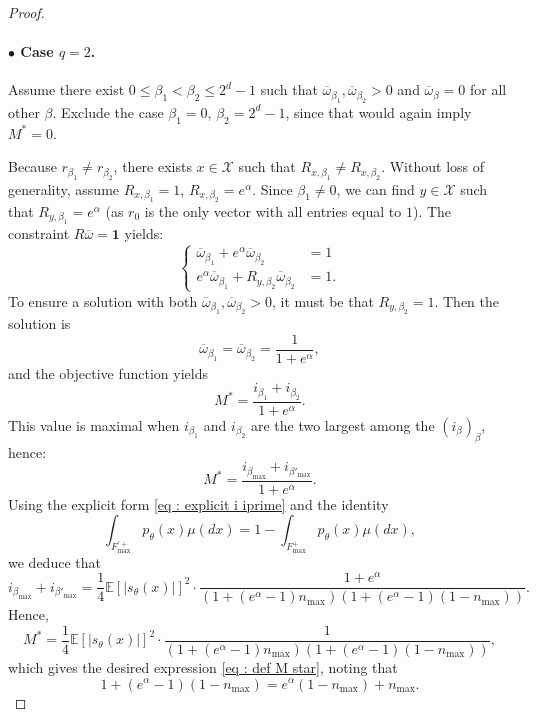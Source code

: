 \documentclass[a4paper, 11pt]{article}
\theoremstyle{definition}
\begin{document}
{\begin{proof}
\paragraph{$\bullet$ Case $q = 2$.}
Assume there exist $0 \le \beta_1 < \beta_2 \le 2^d - 1$ such that $\overline{\omega}_{\beta_1}, \overline{\omega}_{\beta_2} > 0$ and $\overline{\omega}_\beta = 0$ for all other $\beta$. Exclude the case $\beta_1 = 0$, $\beta_2 = 2^d - 1$, since that would again imply $M^* = 0$.

Because $r_{\beta_1} \ne r_{\beta_2}$, there exists $x \in \mathcal{X}$ such that $R_{x,\beta_1} \ne R_{x,\beta_2}$. Without loss of generality, assume $R_{x,\beta_1} = 1$, $R_{x,\beta_2} = e^\alpha$. Since $\beta_1 \ne 0$, we can find $y \in \mathcal{X}$ such that $R_{y,\beta_1} = e^\alpha$ (as $r_0$ is the only vector with all entries equal to $1$). The constraint $R \overline{\omega} = \bm{1}$ yields:
\begin{equation}\label{eq: system 14.5}
\left\{
\begin{aligned}
\overline{\omega}_{\beta_1} + e^\alpha \overline{\omega}_{\beta_2} &= 1 \\
e^\alpha \overline{\omega}_{\beta_1} + R_{y,\beta_2} \overline{\omega}_{\beta_2} &= 1.
\end{aligned}
\right.
\end{equation}
To ensure a solution with both $\overline{\omega}_{\beta_1}, \overline{\omega}_{\beta_2} > 0$, it must be that $R_{y,\beta_2} = 1$. Then the solution is
\[
\overline{\omega}_{\beta_1} = \overline{\omega}_{\beta_2} = \frac{1}{1 + e^\alpha},
\]
and the objective function yields
\[
M^* = \frac{i_{\beta_1} + i_{\beta_2}}{1 + e^\alpha}.
\]
This value is maximal when $i_{\beta_1}$ and $i_{\beta_2}$ are the two largest among the $(i_\beta)_\beta$, hence:
\begin{equation}\label{eq : maximume q is 2}
M^* = \frac{i_{\beta_{\max}} + i_{\beta'_{\max}}}{1 + e^\alpha}.
\end{equation}
Using the explicit form \eqref{eq : explicit i iprime} and the identity
\[
\int_{F^{\prime +}_{\max}} p_\theta(x)\mu(dx) = 1 - \int_{F^{+}_\text{max}} p_\theta(x)\mu(dx),
\]
we deduce that
\[
i_{\beta_{\max}} + i_{\beta'_{\max}} = \frac{1}{4} \mathbb{E}[|s_\theta(x)|]^2 \cdot \frac{1 + e^\alpha}{\left(1 + (e^\alpha - 1)n_{\max}\right)\left(1 + (e^\alpha - 1)(1 - n_{\max})\right)}.
\]
Hence,
\[
M^* = \frac{1}{4} \mathbb{E}[|s_\theta(x)|]^2 \cdot \frac{1}{\left(1 + (e^\alpha - 1)n_{\max}\right)\left(1 + (e^\alpha - 1)(1 - n_{\max})\right)},
\]
which gives the desired expression \eqref{eq : def M star}, noting that
\[
1 + (e^\alpha - 1)(1 - n_{\max}) = e^\alpha(1 - n_{\max}) + n_{\max}.
\]


\end{proof}}
\end{document}
